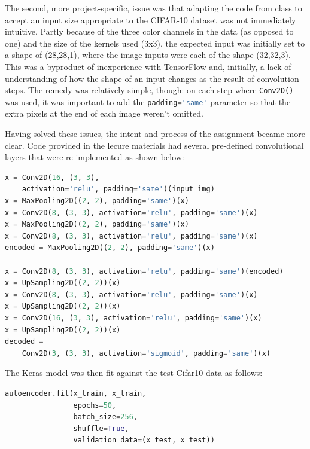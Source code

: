 \documentclass{article}
\begin{document}
\par The second, more project-specific, issue was that adapting the code from class to accept an input size appropriate to the CIFAR-10 dataset was not immediately intuitive.
Partly because of the three color channels in the data (as opposed to one) and the size of the kernels used (3x3), the expected input was initially set to a shape of (28,28,1), where the image inputs were each of the shape (32,32,3).
This was a byproduct of inexperience with TensorFlow and, initially, a lack of understanding of how the shape of an input changes as the result of convolution steps. 
The remedy was relatively simple, though: on each step where \lstinline[language=Python]{Conv2D()} was used, it was important to add the \lstinline[language=Python]{padding='same'} parameter so that the extra pixels at the end of each image weren't omitted.

\par Having solved these issues, the intent and process of the assignment became more clear.
Code provided in the lecure materials had several pre-defined convolutional layers that were re-implemented as shown below:
\begin{lstlisting}[language=Python]
x = Conv2D(16, (3, 3), 
    activation='relu', padding='same')(input_img)
x = MaxPooling2D((2, 2), padding='same')(x)
x = Conv2D(8, (3, 3), activation='relu', padding='same')(x)
x = MaxPooling2D((2, 2), padding='same')(x)
x = Conv2D(8, (3, 3), activation='relu', padding='same')(x)
encoded = MaxPooling2D((2, 2), padding='same')(x)

x = Conv2D(8, (3, 3), activation='relu', padding='same')(encoded)
x = UpSampling2D((2, 2))(x)
x = Conv2D(8, (3, 3), activation='relu', padding='same')(x)
x = UpSampling2D((2, 2))(x)
x = Conv2D(16, (3, 3), activation='relu', padding='same')(x)
x = UpSampling2D((2, 2))(x)
decoded = 
    Conv2D(3, (3, 3), activation='sigmoid', padding='same')(x)
\end{lstlisting}

\par The Keras model was then fit against the test Cifar10 data as follows:

\begin{lstlisting}[language=Python]
autoencoder.fit(x_train, x_train, 
                epochs=50,
                batch_size=256,
                shuffle=True,
                validation_data=(x_test, x_test))

\end{lstlisting}
\end{document}
